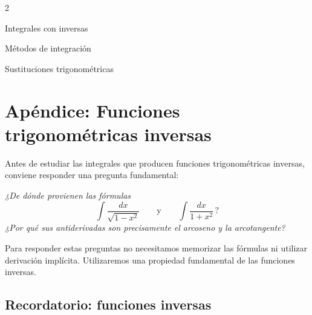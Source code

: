\documentclass[12pt]{article}
\theoremstyle{definition}
\theoremstyle{remark}
\begin{document}
\begin{multicols}{2}
\begin{formulario}{Integrales con inversas}
\end{formulario}
\begin{formulario}{Métodos de integración}
\end{formulario}
\begin{formulario}{Sustituciones trigonométricas}
\end{formulario}
\end{multicols}
\restoregeometry
\endgroup
\clearpage


\section{Ap\'endice: Funciones trigonom\'etricas inversas}

Antes de estudiar las integrales que producen funciones trigonométricas
inversas, conviene responder una pregunta fundamental:

\begin{center}
\emph{¿De dónde provienen las fórmulas}
\[
\int \frac{dx}{\sqrt{1-x^2}}
\qquad\text{y}\qquad
\int \frac{dx}{1+x^2}\,?
\]
\emph{¿Por qué sus antiderivadas son precisamente el arcoseno y la
arcotangente?}
\end{center}

Para responder estas preguntas no necesitamos memorizar las fórmulas ni
utilizar derivación implícita. Utilizaremos una propiedad fundamental de
las funciones inversas.

\subsection*{Recordatorio: funciones inversas}
\end{document}

